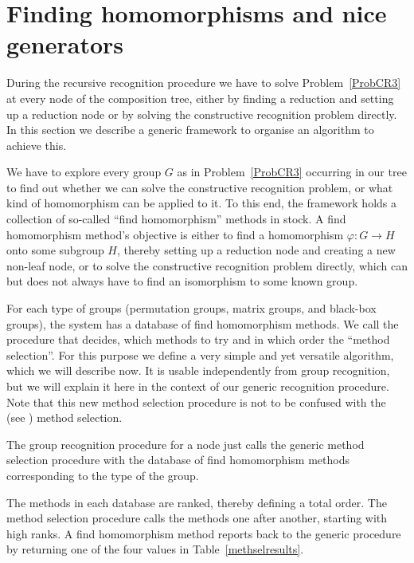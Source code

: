 \section{Finding homomorphisms and nice generators}
\label{findhom}

During the recursive recognition procedure we have to solve
Problem~\ref{ProbCR3} at every node of the composition tree, either
by finding a reduction and setting up a reduction node or by solving 
the constructive recognition problem directly. In this section we describe
a generic framework to organise an algorithm to achieve this.

We have to explore every group $G$ as in Problem~\ref{ProbCR3} 
occurring in our tree to find out whether we 
can solve the constructive recognition 
problem, or what kind of homomorphism can be 
applied to it. To this end, the framework holds a collection
of so-called ``find homomorphism'' methods in stock. A find homomorphism
method's objective is either to find a homomorphism $\varphi: G \to H$
onto some subgroup $H$, thereby setting up a reduction node and 
creating a new non-leaf node, or to
solve the constructive recognition 
problem directly, which can but does not always have to find
an isomorphism to some known group.

For each type of groups (permutation groups, matrix groups, and black-box
groups), the system has a database of find homomorphism methods.
We call the procedure that decides, which methods to try and in which order 
the ``method selection''. For this purpose we define a very simple and yet 
versatile algorithm, which we will describe now. It is usable independently
from group recognition, but we will explain it here in the context of
our generic recognition procedure. Note that this new method selection
procedure is not to be confused with the {\GAP} (see \cite{GAP4}) method
selection. 

The group recognition procedure for a node just calls the generic method
selection procedure with the database of find homomorphism methods
corresponding to the type of the group.

The methods in each database are ranked, thereby defining a total
order. The method selection procedure calls the methods one after another,
starting with high ranks. A find homomorphism method reports back to
the generic procedure by returning one of the four values in
Table~\ref{methselresults}.

